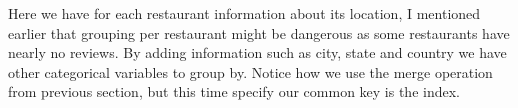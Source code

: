 \documentclass[letterpaper,10pt,english]{jupyterBook}
\begin{document}
\sphinxAtStartPar
Here we have for each restaurant information about its location, I mentioned earlier that grouping per restaurant might be dangerous as some restaurants have nearly no reviews.
By adding information such as city, state and country we have other categorical variables to group by.
Notice how we use the merge operation from previous section, but this time specify our common key is the index.

\begin{sphinxVerbatim}[commandchars=\\\{\}]
     
\end{sphinxVerbatim}
\end{document}
